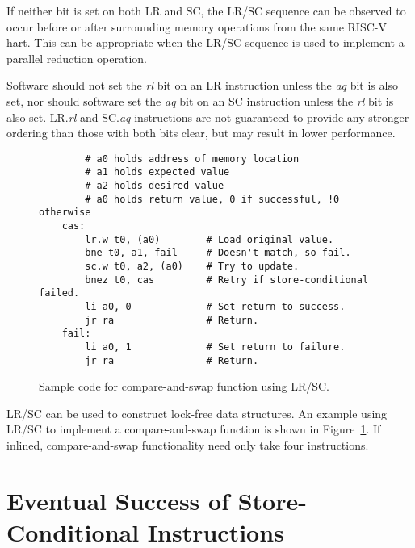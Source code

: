 If neither bit is set on both LR and SC, the LR/SC sequence can be
observed to occur before or after surrounding memory operations from
the same RISC-V hart.  This can be appropriate when the LR/SC
sequence is used to implement a parallel reduction operation.

Software should not set the {\em rl} bit on an LR instruction unless the {\em
aq} bit is also set, nor should software set the {\em aq} bit on an SC
instruction unless the {\em rl} bit is also set.  LR.{\em rl} and SC.{\em aq}
instructions are not guaranteed to provide any stronger ordering than those
with both bits clear, but may result in lower performance.

\begin{figure}[h!]
\begin{center}
\begin{verbatim}
        # a0 holds address of memory location 
        # a1 holds expected value
        # a2 holds desired value
        # a0 holds return value, 0 if successful, !0 otherwise
    cas:
        lr.w t0, (a0)        # Load original value.
        bne t0, a1, fail     # Doesn't match, so fail.
        sc.w t0, a2, (a0)    # Try to update.
        bnez t0, cas         # Retry if store-conditional failed.
        li a0, 0             # Set return to success.
        jr ra                # Return.
    fail:
        li a0, 1             # Set return to failure.
        jr ra                # Return.
\end{verbatim}
\end{center}
\caption{Sample code for compare-and-swap function using LR/SC.}
\label{cas}
\end{figure}

LR/SC can be used to construct lock-free data structures.  An example
using LR/SC to implement a compare-and-swap function is shown in
Figure~\ref{cas}.  If inlined, compare-and-swap functionality need
only take four instructions.

\section{Eventual Success of Store-Conditional Instructions}
\label{sec:lrscseq}

